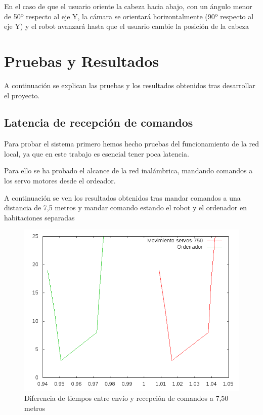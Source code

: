 \documentclass[twoside, 12pt]{epstfg}
\begin{document}
En el caso de que el usuario oriente la cabeza hacia abajo, con un ángulo menor de 50º respecto al eje Y, la cámara se orientará horizontalmente (90º respecto al eje Y) y el robot avanzará hasta que el usuario cambie la posición de la cabeza

\chapter{Pruebas y Resultados}

A continuación se explican las pruebas y los resultados obtenidos tras desarrollar el proyecto.

\section{Latencia de recepción de comandos}

Para probar el sistema primero hemos hecho pruebas del funcionamiento de la red local, ya que en este trabajo es esencial tener poca latencia.

Para ello se ha probado el alcance de la red inalámbrica, mandando comandos a los servo motores desde el ordeador.

A continuación se ven los resultados obtenidos tras mandar comandos a una distancia de 7,5 metros y mandar comando estando el robot y el ordenador en habitaciones separadas

\begin{figure}[h!]
	\centerline{
		\mbox{\includegraphics[width=.80\textwidth]{images/Temp_750.png}}
	}
	\caption{Diferencia de tiempos entre envío y recepción de comandos a 7,50 metros}
\end{figure}
\end{document}
